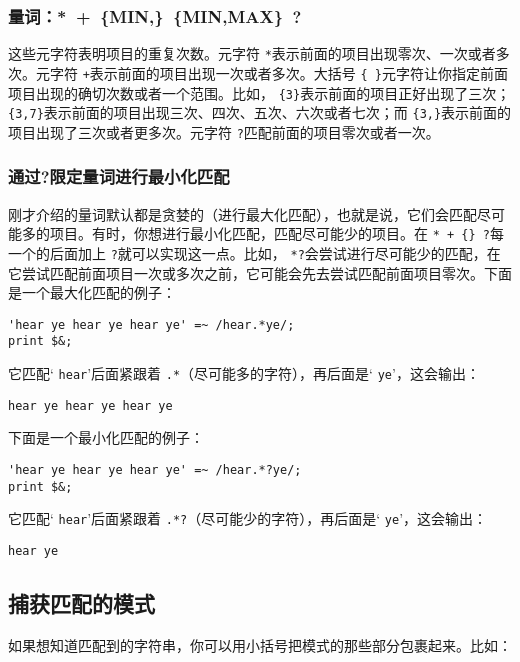 \subsubsection{量词：*\ +\ \{MIN,\}\ \{MIN,MAX\}\ ?}
这些元字符表明项目的重复次数。元字符 \verb|*|表示前面的项目出现零次、一次或者多次。元字符 \verb|+|表示前面的项目出现一次或者多次。大括号 \verb|{ }|元字符让你指定前面项目出现的确切次数或者一个范围。比如，  \verb|{3}|表示前面的项目正好出现了三次； \verb|{3,7}|表示前面的项目出现三次、四次、五次、六次或者七次；而 \verb|{3,}|表示前面的项目出现了三次或者更多次。元字符 \verb|?|匹配前面的项目零次或者一次。

\subsubsection{通过?限定量词进行最小化匹配}
刚才介绍的量词默认都是贪婪的（进行最大化匹配），也就是说，它们会匹配尽可能多的项目。有时，你想进行最小化匹配，匹配尽可能少的项目。在 \verb|* + {} ?|每一个的后面加上 \verb|?|就可以实现这一点。比如， \verb|*?|会尝试进行尽可能少的匹配，在它尝试匹配前面项目一次或多次之前，它可能会先去尝试匹配前面项目零次。下面是一个最大化匹配的例子：

\begin{lstlisting}
'hear ye hear ye hear ye' =~ /hear.*ye/;
print $&;
\end{lstlisting}

它匹配` \verb|hear|'后面紧跟着 \verb|.*|（尽可能多的字符），再后面是` \verb|ye|'，这会输出：

\begin{lstlisting}
hear ye hear ye hear ye
\end{lstlisting}

下面是一个最小化匹配的例子：

\begin{lstlisting}
'hear ye hear ye hear ye' =~ /hear.*?ye/;
print $&;
\end{lstlisting}

它匹配` \verb|hear|'后面紧跟着 \verb|.*?|（尽可能少的字符），再后面是` \verb|ye|'，这会输出：

\begin{lstlisting}
hear ye
\end{lstlisting}

\subsection{捕获匹配的模式}
如果想知道匹配到的字符串，你可以用小括号把模式的那些部分包裹起来。比如：

